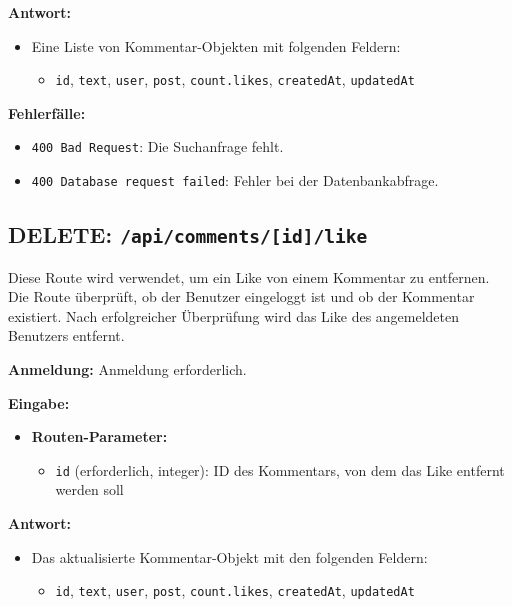 \documentclass[a4paper,12pt]{article}
\begin{document}
\textbf{Antwort:}
\begin{itemize}
    \item Eine Liste von Kommentar-Objekten mit folgenden Feldern:
    \begin{itemize}
        \item \texttt{id},
              \texttt{text},
              \texttt{user},
              \texttt{post},
              \texttt{count.likes},
              \texttt{createdAt},
              \texttt{updatedAt}
    \end{itemize}
\end{itemize}

\textbf{Fehlerfälle:}
\begin{itemize}
    \item \texttt{400 Bad Request}:
        Die Suchanfrage fehlt.
    \item \texttt{400 Database request failed}:
        Fehler bei der Datenbankabfrage.
\end{itemize}

\newpage
\subsection{DELETE: \texttt{/api/comments/[id]/like}}

Diese Route wird verwendet, um ein Like von einem Kommentar zu entfernen. Die
Route überprüft, ob der Benutzer eingeloggt ist und ob der Kommentar existiert.
Nach erfolgreicher Überprüfung wird das Like des angemeldeten Benutzers
entfernt.

\textbf{Anmeldung:} Anmeldung erforderlich.

\textbf{Eingabe:}
\begin{itemize}
    \item \textbf{Routen-Parameter:}
    \begin{itemize}
        \item \texttt{id} (erforderlich, integer):
            ID des Kommentars, von dem das Like entfernt werden soll
    \end{itemize}
\end{itemize}

\textbf{Antwort:}
\begin{itemize}
    \item Das aktualisierte Kommentar-Objekt mit den folgenden Feldern:
    \begin{itemize}
        \item \texttt{id},
              \texttt{text},
              \texttt{user},
              \texttt{post},
              \texttt{count.likes},
              \texttt{createdAt},
              \texttt{updatedAt}
    \end{itemize}
\end{itemize}
\end{document}
